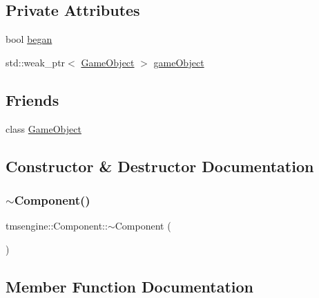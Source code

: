 \subsection*{Private Attributes}
\begin{DoxyCompactItemize}
\item 
bool \hyperlink{classtmsengine_1_1_component_a95d8db246b91bef1abcdbb9a38607526}{began}
\item 
std\+::weak\+\_\+ptr$<$ \hyperlink{classtmsengine_1_1_game_object}{Game\+Object} $>$ \hyperlink{classtmsengine_1_1_component_aa7aaf22a0b308873a2ae755d8b653553}{game\+Object}
\end{DoxyCompactItemize}
\subsection*{Friends}
\begin{DoxyCompactItemize}
\item 
class \hyperlink{classtmsengine_1_1_component_a00df87c957d8f7ee0fc51f07a0542f4a}{Game\+Object}
\end{DoxyCompactItemize}


\subsection{Constructor \& Destructor Documentation}
\mbox{\label{classtmsengine_1_1_component_a764458f5f009e4e01f3c2bdab24b992f}} 
\subsubsection{\texorpdfstring{$\sim$\+Component()}{~Component()}}
{\footnotesize\ttfamily tmsengine\+::\+Component\+::$\sim$\+Component (\begin{DoxyParamCaption}{ }\end{DoxyParamCaption})\hspace{0.3cm}{\ttfamily [virtual]}}



\subsection{Member Function Documentation}
\mbox{\label{classtmsengine_1_1_component_a80494876282c5e19caeffe6c06c8d4bb}} 
